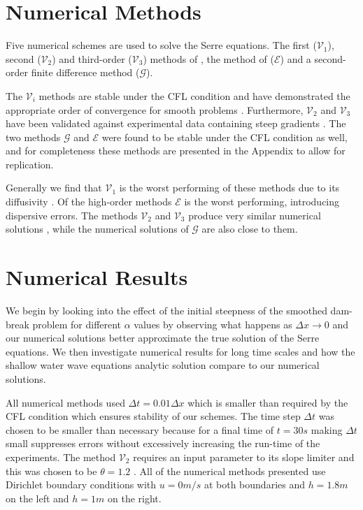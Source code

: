 \documentclass[times]{elsarticle}
\begin{document}
\section{Numerical Methods}
\label{sec:nummeth}
Five numerical schemes are used to solve the Serre equations. The first ($\mathcal{V}_1$), second ($\mathcal{V}_2$) and third-order ($\mathcal{V}_3$) methods of \cite{Zoppou-etal-2017}, the method of \citet{El-etal-2006} ($\mathcal{E}$) and a second-order finite difference method ($\mathcal{G}$).

The $\mathcal{V}_i$ methods are stable under the CFL condition \cite{Harten-etal-1983-357} and have demonstrated the appropriate order of convergence for smooth problems \cite{Zoppou-etal-2017}. Furthermore, $\mathcal{V}_2$ and $\mathcal{V}_3$ have been validated against experimental data containing steep gradients \cite{Zoppou-etal-2017}. The two methods $\mathcal{G}$ and $\mathcal{E}$ were found to be stable under the CFL condition as well, and for completeness these methods are presented in the Appendix to allow for replication.

Generally we find that $\mathcal{V}_1$ is the worst performing of these methods due to its diffusivity \cite{Zoppou-etal-2017}. Of the high-order methods $\mathcal{E}$ is the worst performing, introducing dispersive errors. The methods $\mathcal{V}_2$ and $\mathcal{V}_3$ produce very similar numerical solutions \cite{Zoppou-etal-2017}, while the numerical solutions of $\mathcal{G}$ are also close to them.


\section{Numerical Results}
\label{section:NumRes}
We begin by looking into the effect of the initial steepness of the smoothed dam-break problem for different $\alpha$ values by observing what happens as $\Delta x \rightarrow 0$ and our numerical solutions better approximate the true solution of the Serre equations. We then investigate numerical results for long time scales and how the shallow water wave equations analytic solution compare to our numerical solutions. 

All numerical methods used $\Delta t = 0.01 \Delta x$ which is smaller than required by the CFL condition \cite{Harten-etal-1983-357} which ensures stability of our schemes. The time step $\Delta t$ was chosen to be smaller than necessary because for a final time of $t=30s$ making $\Delta t$ small suppresses errors without excessively increasing the run-time of the experiments. The method $\mathcal{V}_2$ requires an input parameter to its slope limiter and this was chosen to be $\theta = 1.2$ \cite{Zoppou-etal-2017}. All of the numerical methods presented use Dirichlet boundary conditions with $u = 0m/s$ at both boundaries and $h =1.8m$ on the left and $h =1m$ on the right.
\end{document}
